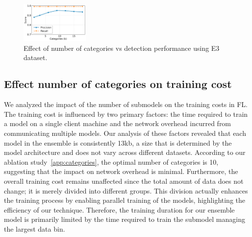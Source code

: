 \begin{figure}[!t]
  \centering
  \includegraphics[width=0.3\textwidth]{fig/kvsscore.pdf}
  \caption{Effect of number of categories vs detection performance using E3 dataset.}
  \label{catgvsscore}
  \vspace{-2ex}
\end{figure}

\subsection*{Effect number of categories on training cost}
\label{app:traincost}

We analyzed the impact of the number of submodels on the training costs in FL. The training cost is influenced by two primary factors: the time required to train a \gnnshort model on a single client machine and the network overhead incurred from communicating multiple models. Our analysis of these factors revealed that each \gnnshort model in the ensemble is consistently 13kb, a size that is determined by the model architecture and does not vary across different datasets. According to our ablation study~\ref{app:categories}, the optimal number of categories is 10, suggesting that the impact on network overhead is minimal. Furthermore, the overall training cost remains unaffected since the total amount of data does not change; it is merely divided into different groups. This division actually enhances the training process by enabling parallel training of the models, highlighting the efficiency of our technique. Therefore, the training duration for our ensemble model is primarily limited by the time required to train the submodel managing the largest data bin.



